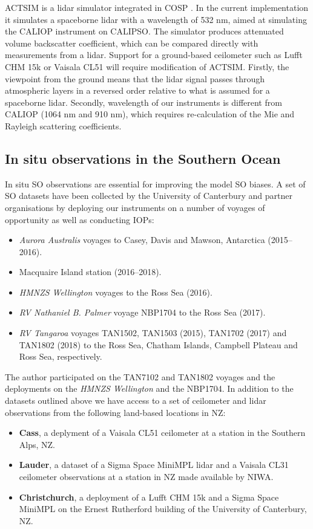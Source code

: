 ACTSIM is a lidar simulator integrated in COSP
\citep{chepfer2008,chiriaco2006}. In the current implementation it simulates a
spaceborne lidar with a wavelength of 532 nm, aimed at simulating the CALIOP
instrument on CALIPSO. The simulator produces attenuated volume backscatter
coefficient, which can be compared directly with measurements from a lidar.
Support for a ground-based ceilometer such as Lufft CHM 15k or Vaisala CL51
will require modification of ACTSIM. Firstly, the viewpoint from
the ground means that the lidar signal passes through atmospheric layers in a reversed
order relative to what is assumed for a spaceborne lidar. Secondly,
wavelength of our instruments is different from CALIOP (1064 nm and 910 nm),
which requires re-calculation of the Mie and Rayleigh scattering coefficients.

\subsection{In situ observations in the Southern Ocean}

In situ SO observations are essential for improving the model SO biases.
A set of SO datasets have been collected by the University of Canterbury
and partner organisations by deploying our instruments on a number
of voyages of opportunity as well as conducting IOPs:

\begin{itemize}
\item \textit{Aurora Australis} voyages to Casey, Davis and Mawson, Antarctica (2015--2016).
\item Macquaire Island station (2016--2018).
\item \textit{HMNZS Wellington} voyages to the Ross Sea (2016).
\item \textit{RV Nathaniel B. Palmer} voyage NBP1704 to the Ross Sea (2017).
\item \textit{RV Tangaroa} voyages TAN1502, TAN1503 (2015), TAN1702 (2017) and TAN1802 (2018)
to the Ross Sea, Chatham Islands, Campbell Plateau and Ross Sea, respectively.
\end{itemize}

\noindent
The author participated on the TAN7102 and TAN1802 voyages and the deployments
on the \textit{HMNZS Wellington} and the NBP1704.
In addition to the datasets outlined above we have access to a set of
ceilometer and lidar observations from the following land-based locations in NZ:

\begin{itemize}
\item \textbf{Cass}, a deplyment of a Vaisala CL51 ceilometer at a station in the
Southern Alps, NZ.
\item \textbf{Lauder}, a dataset of a Sigma Space MiniMPL lidar and a Vaisala CL31
ceilometer observations at a station in NZ made available by NIWA.
\item \textbf{Christchurch}, a deployment of a Lufft CHM 15k and a Sigma Space MiniMPL on the
Ernest Rutherford building of the University of Canterbury, NZ.
\end{itemize}

